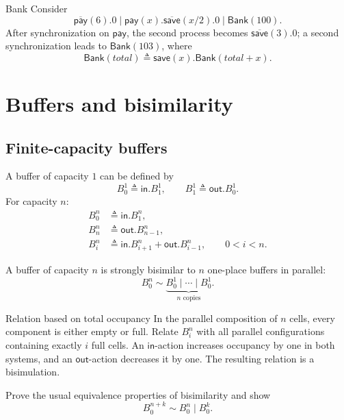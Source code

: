 \documentclass[a4paper]{article}
\begin{document}
\begin{snippetexample}{Bank}
    Consider
    \[
        \overline{\mathsf{pay}}(6).0
        \mid
        \mathsf{pay}(x).\overline{\mathsf{save}}(x/2).0
        \mid
        \mathsf{Bank}(100).
    \]
    After synchronization on \(\mathsf{pay}\), the second process becomes \(\overline{\mathsf{save}}(3).0\); a second synchronization leads to \(\mathsf{Bank}(103)\), where
    \[
        \mathsf{Bank}(total)
        \triangleq
        \mathsf{save}(x).\mathsf{Bank}(total+x).
    \]
\end{snippetexample}

\section{Buffers and bisimilarity}

\subsection{Finite-capacity buffers}

A buffer of capacity \(1\) can be defined by
\[
    B_0^1\triangleq\mathsf{in}.B_1^1,
    \qquad
    B_1^1\triangleq\mathsf{out}.B_0^1.
\]
For capacity \(n\):
\begin{align*}
    B_0^n&\triangleq\mathsf{in}.B_1^n,\\
    B_n^n&\triangleq\mathsf{out}.B_{n-1}^n,\\
    B_i^n&\triangleq
    \mathsf{in}.B_{i+1}^n
    +
    \mathsf{out}.B_{i-1}^n,
    \qquad 0<i<n.
\end{align*}

\begin{snippettheorem}{}
    A buffer of capacity \(n\) is strongly bisimilar to \(n\) one-place buffers in parallel:
    \[
        B_0^n
        \sim
        \underbrace{B_0^1\mid\cdots\mid B_0^1}_{n\text{ copies}}.
    \]
\end{snippettheorem}

\begin{snippetproof}{Relation based on total occupancy}
    In the parallel composition of \(n\) cells, every component is either empty or full.
    Relate \(B_i^n\) with all parallel configurations containing exactly \(i\) full cells.
    An \(\mathsf{in}\)-action increases occupancy by one in both systems, and an \(\mathsf{out}\)-action decreases it by one.
    The resulting relation is a bisimulation.
\end{snippetproof}

\begin{snippetexercise}{}
    Prove the usual equivalence properties of bisimilarity and show
    \[
        B_0^{n+k}
        \sim
        B_0^n\mid B_0^k.
    \]
\end{snippetexercise}
\end{document}
